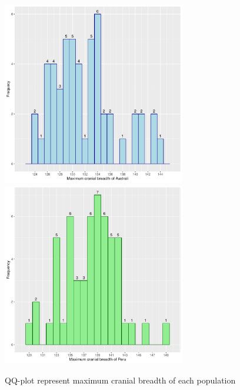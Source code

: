 \documentclass[12pt, oneside]{report}\usepackage[]{graphicx}\usepackage[]{color}
\begin{document}
\begin{Schunk}

\includegraphics[width=8cm,height=8cm]{figure/unnamed-chunk-8-1} \includegraphics[width=8cm,height=8cm]{figure/unnamed-chunk-8-2} \end{Schunk}
\newpage
\begin{center}
QQ-plot represent maximum cranial breadth of each population \\
\end{center}
\end{document}
